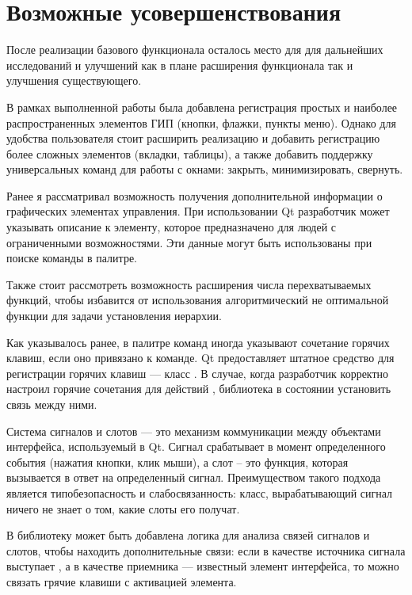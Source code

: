 \section{Возможные усовершенствования}

После реализации базового функционала осталось место для для дальнейших
исследований и улучшений как в плане расширения функционала так и улучшения
существующего.

В рамках выполненной работы была добавлена регистрация простых и наиболее
распространенных элементов ГИП (кнопки, флажки, пункты меню). Однако для
удобства пользователя стоит расширить реализацию и добавить регистрацию более
сложных элементов (вкладки, таблицы), а также добавить поддержку универсальных
команд для работы с окнами: закрыть, минимизировать, свернуть.

Ранее я рассматривал \cite{polshakovvoice} возможность получения дополнительной
информации о графических элементах управления. При использовании Qt разработчик
может указывать описание к элементу, которое предназначено для людей с
ограниченными возможностями. Эти данные могут быть использованы при поиске
команды в палитре.

Также стоит рассмотреть возможность расширения числа перехватываемых функций,
чтобы избавится от использования алгоритмический не оптимальной функции для
задачи установления иерархии.

Как указывалось ранее, в палитре команд иногда указывают сочетание горячих
клавиш, если оно привязано к команде. Qt предоставляет штатное средство для
регистрации горячих клавиш — класс . В случае, когда разработчик
корректно настроил горячие сочетания для действий , библиотека в
состоянии установить связь между ними.

Система сигналов и слотов — это механизм коммуникации между объектами
интерфейса, используемый в Qt. Сигнал срабатывает в момент определенного
события (нажатия кнопки, клик мыши), а слот – это функция, которая вызывается
в ответ на определенный сигнал. Преимуществом такого подхода является
типобезопасность и слабосвязанность: класс, вырабатывающий сигнал ничего не
знает о том, какие слоты его получат.

В библиотеку может быть добавлена логика для анализа связей сигналов и слотов,
чтобы находить дополнительные связи: если в качестве источника сигнала выступает
, а в качестве приемника — известный элемент интерфейса, то
можно связать грячие клавиши с активацией элемента.
